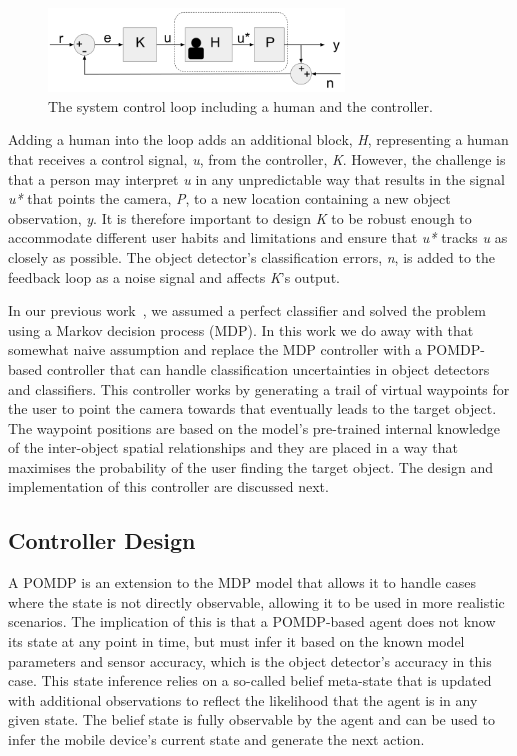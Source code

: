 \documentclass[runningheads]{llncs}
\begin{document}
\begin{figure}
  \centering
  \includegraphics[width=0.7\textwidth]{figures/control_loop.png}
  \caption{The system control loop including a human and the controller.}\label{fig:sys-diagram}
\end{figure}

Adding a human into the loop adds an additional block, \emph{H}, representing a human that receives a control signal, \emph{u}, from the controller, \emph{K}. 
However, the challenge is that a person may interpret \emph{u} in any unpredictable way that results in the signal \emph{u*} that points the camera, \emph{P}, to a new location containing a new object observation, \emph{y}.
It is therefore important to design \emph{K} to be robust enough to accommodate different user habits and limitations and ensure that \emph{u*} tracks \emph{u} as closely as possible. 
The object detector's classification errors, \emph{n}, is added to the feedback loop as a noise signal and affects \emph{K}'s output.

In our previous work~\cite{lock2019active}, we assumed a perfect classifier and solved the problem using a Markov decision process (MDP). 
In this work we do away with that somewhat naive assumption and replace the MDP controller with a POMDP-based controller that can handle classification uncertainties in object detectors and classifiers. 
This controller works by generating a trail of virtual waypoints for the user to point the camera towards that eventually leads to the target object.
The waypoint positions are based on the model's pre-trained internal knowledge of the inter-object spatial relationships and they are placed in a way that maximises the probability of the user finding the target object.
The design and implementation of this controller are discussed next.

\subsection{Controller Design}

A POMDP is an extension to the MDP model that allows it to handle cases where the state is not directly observable, allowing it to be used in more realistic scenarios. 
The implication of this is that a POMDP-based agent does not know its state at any point in time, but must infer it based on the known model parameters and sensor accuracy, which is the object detector's accuracy in this case.
This state inference relies on a so-called belief meta-state that is updated with additional observations to reflect the likelihood that the agent is in any given state.
The belief state is fully observable by the agent and can be used to infer the mobile device's current state and generate the next action.
\end{document}
